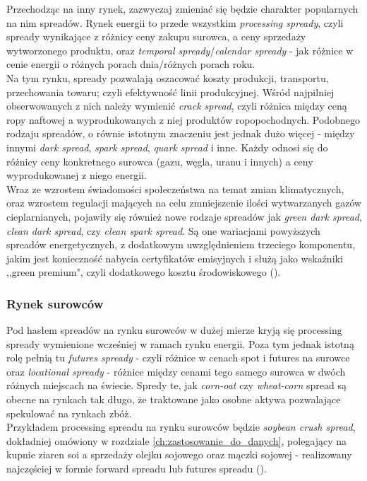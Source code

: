 Przechodząc na inny rynek, zazwyczaj zmieniać się będzie charakter popularnych na nim spreadów. Rynek energii to przede wszystkim \emph{processing spready}, czyli spready wynikające z różnicy ceny zakupu surowca, a ceny sprzedaży wytworzonego produktu, oraz \emph{temporal spready}/\emph{calendar spready} - jak różnice w cenie energii o różnych porach dnia/różnych porach roku.\\
Na tym rynku, spready pozwalają oszacować koszty produkcji, transportu, przechowania towaru; czyli efektywność linii produkcyjnej. Wśród najpilniej obserwowanych z nich należy wymienić \emph{crack spread}, czyli różnica między ceną ropy naftowej a wyprodukowanych z niej produktów ropopochodnych. Podobnego rodzaju spreadów, o równie istotnym znaczeniu jest jednak dużo więcej - między innymi \emph{dark spread}, \emph{spark spread}, \emph{quark spread} i inne. Każdy odnosi się do różnicy ceny konkretnego surowca (gazu, węgla, uranu i innych) a ceny wyprodukowanej z niego energii.\\
Wraz ze wzrostem świadomości społeczeństwa na temat zmian klimatycznych, oraz wzrostem regulacji mających na celu zmniejszenie ilości wytwarzanych gazów cieplarnianych, pojawiły się również nowe rodzaje spreadów jak \emph{green dark spread}, \emph{clean dark spread}, czy \emph{clean spark spread}. Są one wariacjami powyższych spreadów energetycznych, z dodatkowym uwzględnieniem trzeciego komponentu, jakim jest konieczność nabycia certyfikatów emisyjnych i służą jako wskaźniki ,,green premium", czyli dodatkowego kosztu środowiskowego (\cite{Carmona_Clean_Spreads}).

\subsubsection{Rynek surowców}

Pod hasłem spreadów na rynku surowców w dużej mierze kryją się processing spready wymienione wcześniej w ramach rynku energii. Poza tym jednak istotną rolę pełnią tu \emph{futures spready} - czyli różnice w cenach spot i futures na surowce oraz \emph{locational spready} - różnice między cenami tego samego surowca w dwóch różnych miejscach na świecie. Spredy te, jak \emph{corn-oat} czy \emph{wheat-corn} spread są obecne na rynkach tak długo, że traktowane jako osobne aktywa pozwalające spekulować na rynkach zbóż.\\
Przykładem processing spreadu na rynku surowców będzie \emph{soybean crush spread}, dokładniej omówiony w rozdziale \ref{ch:zastosowanie_do_danych}, polegający na kupnie ziaren soi a sprzedaży olejku sojowego oraz mączki sojowej - realizowany najczęściej w formie forward spreadu lub futures spreadu (\cite{Agro_Spreads}).